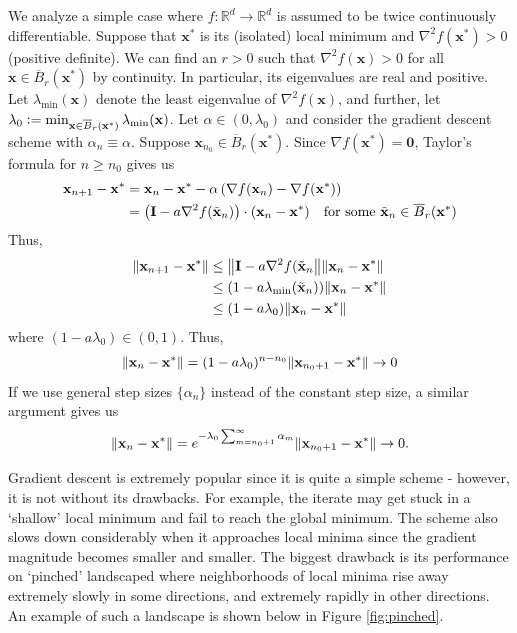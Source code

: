 We analyze a simple case where $f \colon \mathbb{R}^d \to \mathbb{R}^d$ is assumed to be twice continuously differentiable. Suppose that $\mathbf{x}^*$ is its (isolated) local minimum and $\nabla^2 f(\mathbf{x}^*) > 0$ (positive definite). We can find an $r > 0$ such that $\nabla^2 f(\mathbf{x}) > 0$ for all $\mathbf{x} \in \overline{B}_r(\mathbf{x}^*)$ by continuity. In particular, its eigenvalues are real and positive. Let $\lambda_{\min}(\mathbf{x})$ denote the least eigenvalue of $\nabla^2 f(\mathbf{x})$, and further, let $\lambda_0 \vcentcolon= \min_{\mathbf{x} \in \overline{B}_r(\mathbf{x}^*)} \lambda_{\min}(\mathbf{x})$. Let $\alpha \in (0,\lambda_0)$ and consider the gradient descent scheme with $\alpha_n \equiv \alpha$. Suppose $\mathbf{x}_{n_0} \in \overline{B}_r(\mathbf{x}^*)$. Since $\nabla f(\mathbf{x}^*) = \mathbf{0}$, Taylor's formula for $n \geq n_0$ gives us
\begin{align*}
    \mathbf{x}_{n+1} - \mathbf{x}^* &= \mathbf{x}_n - \mathbf{x}^* - \alpha \left( \nabla f(\mathbf{x}_n) - \nabla f(\mathbf{x}^*) \right) \\
    &= \left( \mathbf{I} - a \nabla^2 f(\Tilde{\mathbf{x}}_n) \right) \cdot (\mathbf{x}_n -\mathbf{x}^*) \quad \text{for some } \Tilde{\mathbf{x}}_n \in \overline{B}_r(\mathbf{x}^*) 
\end{align*}
Thus, 
\begin{align*}
    \norm{\mathbf{x}_{n+1} - \mathbf{x}^*} &\leq \norm{\mathbf{I} - a \nabla^2 f(\Tilde{\mathbf{x}}_n} \norm{\mathbf{x}_n -\mathbf{x}^*} \\
    &\leq (1 - a\lambda_{\min}(\Tilde{\mathbf{x}}_n)) \norm{\mathbf{x}_n -\mathbf{x}^*} \\
    &\leq (1 - a\lambda_0)  \norm{\mathbf{x}_n -\mathbf{x}^*}
\end{align*}
where $(1-a\lambda_0) \in (0,1)$. Thus, 
\[
     \norm{\mathbf{x}_n -\mathbf{x}^*} = (1-a\lambda_0)^{n-n_0}  \norm{\mathbf{x}_{n_0+1} -\mathbf{x}^*} \to 0
\]
If we use general step sizes $\{\alpha_n\}$ instead of the constant step size, a similar argument gives us
\[
     \norm{\mathbf{x}_n -\mathbf{x}^*} = e^{-\lambda_0 \sum_{m=n_0+1}^{\infty} \alpha_m}  \norm{\mathbf{x}_{n_0+1} -\mathbf{x}^*} \to 0.
\] 

Gradient descent is extremely popular since it is quite a simple scheme - however, it is not without its drawbacks. For example, the iterate may get stuck in a `shallow' local minimum and fail to reach the global minimum. The scheme also slows down considerably when it approaches local minima since the gradient magnitude becomes smaller and smaller. The biggest drawback is its performance on `pinched' landscaped where neighborhoods of local minima rise away extremely slowly in some directions, and extremely rapidly in other directions. An example of such a landscape is shown below in Figure \ref{fig:pinched}. 

